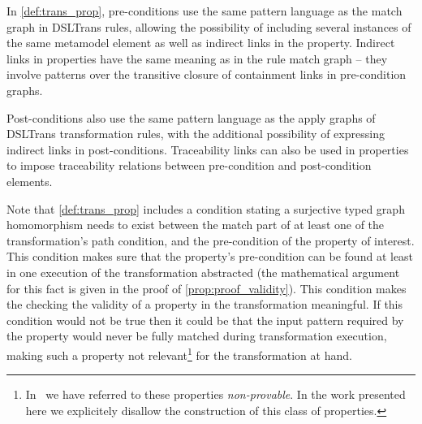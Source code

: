 

In \cref{def:trans_prop}, pre-conditions use the same pattern language as the match graph in
DSLTrans rules, allowing the possibility of including several instances of
the same metamodel element as well as indirect links in the property. Indirect links in properties have
the same meaning as in the rule match graph -- they
involve patterns over the transitive closure of containment links in pre-condition graphs.

Post-conditions also use the same pattern language as the
apply graphs of DSLTrans transformation rules, with the additional
possibility of expressing indirect links in post-conditions. Traceability links can
also be used in properties to impose traceability relations between pre-condition
and post-condition elements.

Note that \cref{def:trans_prop} includes a condition stating a surjective typed graph homomorphism needs to exist between the match part of at least one of the transformation's path condition, and the pre-condition of the property of interest. This condition makes sure that the property's pre-condition can be found at least in one execution of the transformation abstracted (the mathematical argument for this fact is given in the proof of \cref{prop:proof_validity}). This condition makes the checking the validity of a property in the transformation meaningful. If this condition would not be true then it could be that the input pattern required by the property would never be fully matched during transformation execution, making such a property not relevant\footnote{In~\cite{DBLP:conf/sle/BarrocaLAFS10} we have referred to these properties \emph{non-provable}. In the work presented here we explicitely disallow the construction of this class of properties.} for the transformation at hand.


